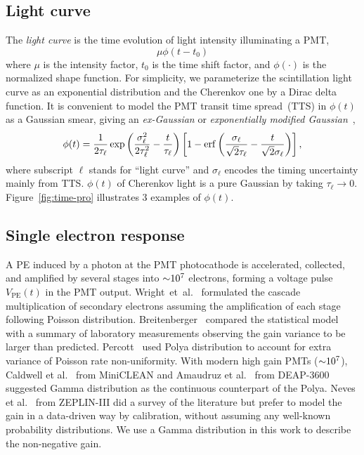 \subsection{Light curve}
\label{sec:lc}
The \textit{light curve} is the time evolution of light intensity illuminating a PMT,
\begin{equation}
  \label{eq:light-curve}
  \mu\phi(t-t_0)
\end{equation}
where $\mu$ is the intensity factor, $t_0$ is the time shift factor, and $\phi(\cdot)$ is the normalized shape function. For simplicity, we parameterize the scintillation light curve as an exponential distribution and the Cherenkov one by a Dirac delta function.  It is convenient to model the PMT transit time spread~(TTS) in $\phi(t)$ as a Gaussian smear, giving an \textit{ex-Gaussian} or \textit{exponentially modified Gaussian}~\cite{li_separation_2016},
\begin{align}
    \phi(t) = \frac{1}{2\tau_\ell} \exp\left(\frac{\sigma_\ell^2}{2\tau_\ell^2}-\frac{t}{\tau_\ell}\right) \left[1 - \operatorname{erf}\left( \frac{\sigma_\ell}{\sqrt{2}\tau_\ell} - \frac{t}{\sqrt{2}\sigma_\ell} \right)\right],
    \label{eq:time-pro}
\end{align}
where subscript $\ell$ stands for ``light curve'' and $\sigma_\ell$ encodes the timing uncertainty mainly from TTS. $\phi(t)$ of Cherenkov light is a pure Gaussian by taking $\tau_\ell \rightarrow 0$. Figure~\ref{fig:time-pro} illustrates 3 examples of $\phi(t)$. 

\subsection{Single electron response}
\label{subsec:spe}

A PE induced by a photon at the PMT photocathode is accelerated, collected, and amplified by several stages into $\num[retain-unity-mantissa=false]{\sim 1e7}$ electrons, forming a voltage pulse $V_\mathrm{PE}(t)$ in the PMT output.  Wright~et~al.~\cite{wright_low_1954} formulated the cascade multiplication of secondary electrons assuming the amplification of each stage following Poisson distribution.  Breitenberger~\cite{breitenberger_scintillation_1955} compared the statistical model with a summary of laboratory measurements observing the gain variance to be larger than predicted. Percott~\cite{prescott_statistical_1966} used Polya distribution to account for extra variance of Poisson rate non-uniformity.  With modern high gain PMTs ($\num[retain-unity-mantissa=false]{\sim 1e7}$), Caldwell et al.~\cite{caldwell_characterization_2013} from MiniCLEAN and Amaudruz et al.~\cite{amaudruz_-situ_2019} from DEAP-3600 suggested Gamma distribution as the continuous counterpart of the Polya.  Neves et al.~\cite{neves_calibration_2010} from ZEPLIN-III did a survey of the literature but prefer to model the gain in a data-driven way by calibration, without assuming any well-known probability distributions.  We use a Gamma distribution in this work to describe the non-negative gain.

